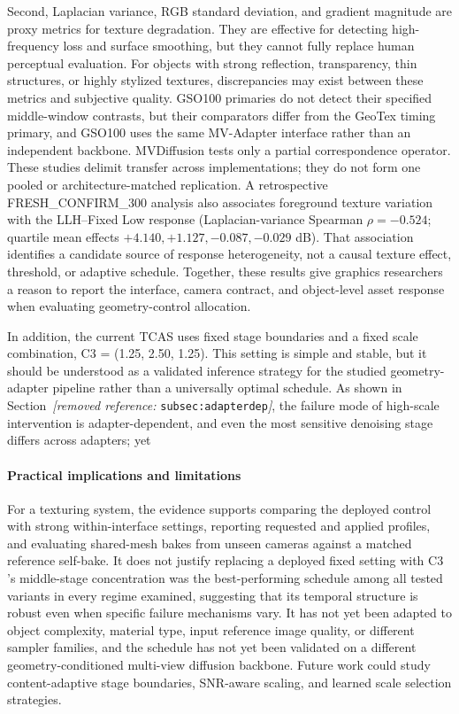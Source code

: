 \documentclass[times,twocolumn,final]{elsarticle}
\providecommand{\DIFadd}[1]{{\protect\color{blue} \sf #1}} %
\providecommand{\DIFdel}[1]{{\protect\color{red} \scriptsize #1}} %
\providecommand{\DIFaddbegin}{} %
\providecommand{\DIFaddend}{} %
\providecommand{\DIFdelbegin}{} %
\providecommand{\DIFdelend}{} %
\begin{document}
\DIFdel{Second, Laplacian variance, RGB standard deviation, and gradient magnitude are proxy metrics for texture degradation. They are effective for detecting high-frequency loss and surface smoothing, but they cannot fully replace human perceptual evaluation.
For objects with strong reflection, transparency, thin structures, or highly stylized textures, discrepancies may exist between these metrics and subjective quality.
}\DIFdelend \DIFaddbegin \DIFadd{GSO100 primaries do not detect their specified middle-window contrasts, but their comparators differ from the GeoTex timing primary, and GSO100 uses the same MV-Adapter interface rather than an independent backbone. MVDiffusion tests only a partial correspondence operator. These studies delimit transfer across implementations; they do not form one pooled or architecture-matched replication. A retrospective FRESH\_CONFIRM\_300 analysis also associates foreground texture variation with the LLH--Fixed Low response (Laplacian-variance Spearman $\rho=-0.524$; quartile mean effects $+4.140,+1.127,-0.087,-0.029$ dB). That association identifies a candidate source of response heterogeneity, not a causal texture effect, threshold, or adaptive schedule. Together, these results give graphics researchers a reason to report the interface, camera contract, and object-level asset response when evaluating geometry-control allocation.
}\DIFaddend

\DIFdelbegin \DIFdel{In addition, the current TCAS uses fixed stage boundaries and a fixed scale combination, C3 = (1.25, 2.50, 1.25). This setting is simple and stable, but it should be understood as a validated inference strategy for the studied geometry-adapter pipeline rather than a universally optimal schedule. As shown in Section~\textit{[removed reference: }\texttt{subsec:adapterdep}\textit{]}, the failure mode of high-scale intervention is adapter-dependent, and even the most sensitive denoising stage differs across adapters; yet }\DIFdelend \DIFaddbegin \paragraph{Practical implications and limitations}
\DIFadd{For a texturing system, the evidence supports comparing the deployed control with strong within-interface settings, reporting requested and applied profiles, and evaluating shared-mesh bakes from unseen cameras against a matched reference self-bake. It does not justify replacing a deployed fixed setting with }\DIFaddend C3 \DIFdelbegin \DIFdel{'s middle-stage concentration was the best-performing schedule among all tested variants in every regime examined, suggesting that its temporal structure is robust even when specific failure mechanisms vary. It has not yet been adapted to object complexity, material type, input reference image quality, or different sampler families, and the schedule has not yet been validated on a different geometry-conditioned multi-view diffusion backbone. Future work could study content-adaptive stage boundaries, SNR-aware scaling, and learned scale selection strategies. }%
\end{document}
